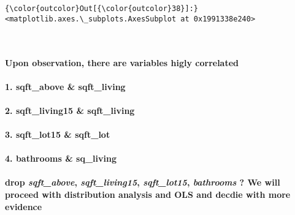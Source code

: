 \documentclass[11pt]{article}
\begin{document}
\begin{Verbatim}[commandchars=\\\{\}]
{\color{outcolor}Out[{\color{outcolor}38}]:} <matplotlib.axes.\_subplots.AxesSubplot at 0x1991338e240>
\end{Verbatim}
            
    \begin{center}
    \end{center}
    { \hspace*{\fill} \\}
    
    \paragraph{Upon observation, there are variables higly
correlated}\label{upon-observation-there-are-variables-higly-correlated}

\paragraph{1. sqft\_above \& sqft\_living}\label{sqft_above-sqft_living}

\paragraph{2. sqft\_living15 \&
sqft\_living}\label{sqft_living15-sqft_living}

\paragraph{3. sqft\_lot15 \& sqft\_lot}\label{sqft_lot15-sqft_lot}

\paragraph{4. bathrooms \& sq\_living}\label{bathrooms-sq_living}

    \paragraph{\texorpdfstring{drop \emph{sqft\_above},
\emph{sqft\_living15}, \emph{sqft\_lot15}, \emph{bathrooms} ? We will
proceed with distribution analysis and OLS and decdie with more
evidence}{drop sqft\_above, sqft\_living15, sqft\_lot15, bathrooms ? We will proceed with distribution analysis and OLS and decdie with more evidence}}\label{drop-sqft_above-sqft_living15-sqft_lot15-bathrooms-we-will-proceed-with-distribution-analysis-and-ols-and-decdie-with-more-evidence}
\end{document}
